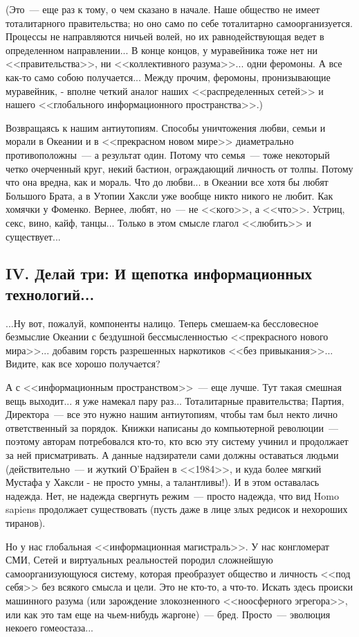 \documentclass{scrbook}
\newcommand{\flqq}{<<}
\newcommand{\frqq}{>>}
\newcommand{\mdash}{~--- }
\newcommand{\essaysection}[1]{\subsection*{#1}\nopagebreak}
\begin{document}
(Это{\mdash}еще раз к тому, о чем сказано в начале. Наше общество не имеет тоталитарного правительства; но оно само по себе тоталитарно самоорганизуется. Процессы не направляются ничьей волей, но их равнодействующая ведет в определенном направлении... В конце концов, у муравейника тоже нет ни {\flqq}правительства{\frqq}, ни {\flqq}коллективного разума{\frqq}... одни феромоны. А все как-то само собою получается... Между прочим, феромоны, пронизывающие муравейник, - вполне четкий аналог наших {\flqq}распределенных сетей{\frqq} и нашего {\flqq}глобального информационного пространства{\frqq}.)

Возвращаясь к нашим антиутопиям. Способы уничтожения любви, семьи и морали в Океании и в {\flqq}прекрасном новом мире{\frqq} диаметрально противоположны{\mdash}а результат один. Потому что семья{\mdash}тоже некоторый четко очерченный круг, некий бастион, ограждающий личность от толпы. Потому что она вредна, как и мораль. Что до любви... в Океании все хотя бы любят Большого Брата, а в Утопии Хаксли уже вообще никто никого не любит. Как хомячки у Фоменко. Вернее, любят, но{\mdash}не {\flqq}кого{\frqq}, а {\flqq}что{\frqq}. Устриц, секс, вино, кайф, танцы... Только в этом смысле глагол {\flqq}любить{\frqq} и существует... 
       
\essaysection{IV. Делай три: И щепотка информационных технологий...}
       
...Ну вот, пожалуй, компоненты налицо. Теперь смешаем-ка бессловесное безмыслие Океании с бездушной бессмысленностью {\flqq}прекрасного нового мира{\frqq}... добавим горсть разрешенных наркотиков {\flqq}без привыкания{\frqq}... Видите, как все хорошо получается?

А с {\flqq}информационным пространством{\frqq}{\mdash}еще лучше. Тут такая смешная вещь выходит... я уже намекал пару раз... Тоталитарные правительства; Партия, Директора{\mdash}все это нужно нашим антиутопиям, чтобы там был некто лично ответственный за порядок. Книжки написаны до компьютерной революции{\mdash}поэтому авторам потребовался кто-то, кто всю эту систему учинил и продолжает за ней присматривать. А данные надзиратели сами должны оставаться людьми (действительно{\mdash}и жуткий О'Брайен в {\flqq}1984{\frqq}, и куда более мягкий Мустафа у Хаксли - не просто умны, а талантливы!). И в этом оставалась надежда. Нет, не надежда свергнуть режим{\mdash}просто надежда, что вид Homo sapiens продолжает существовать (пусть даже в лице злых редисок и нехороших тиранов).
 
Но у нас глобальная {\flqq}информационная магистраль{\frqq}. У нас конгломерат СМИ, Сетей и виртуальных реальностей породил сложнейшую самоорганизующуюся систему, которая преобразует общество и личность {\flqq}под себя{\frqq} без всякого смысла и цели. Это не кто-то, а что-то. Искать здесь происки машинного разума (или зарождение злокозненного {\flqq}ноосферного эгрегора{\frqq}, или как это там еще на чьем-нибудь жаргоне){\mdash}бред. Просто{\mdash}эволюция некоего гомеостаза...
\end{document}
